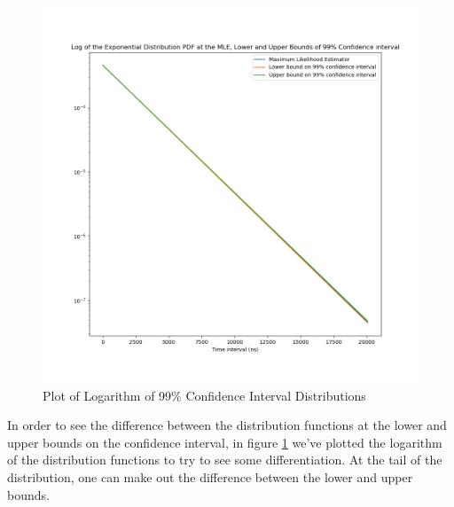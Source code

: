 \begin{figure}[H]
    \centering
    \includegraphics[scale=0.37]{img/log_distributions_confidence_interval} 
    \caption{Plot of Logarithm of 99\% Confidence Interval Distributions}
    \label{log_distributions}
\end{figure} 
In order to see the difference between the distribution functions at the lower and upper bounds on the confidence interval, in figure \ref{log_distributions} we've plotted the logarithm of the distribution functions to try to see some differentiation. At the tail of the distribution, one can make out the difference between the lower and upper bounds.


